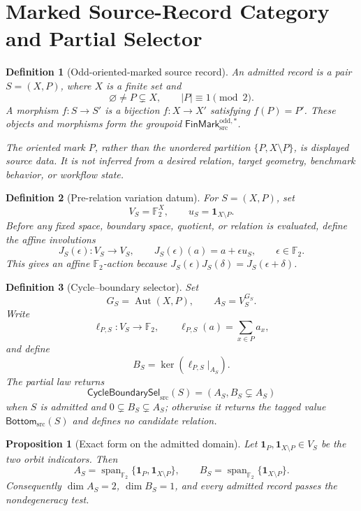 \documentclass[11pt]{article}
\newtheorem{definition}{Definition}
\newtheorem{proposition}{Proposition}
\newcommand{\Ftwo}{\mathbb F_2}
\newcommand{\Sel}{\mathsf{CycleBoundarySel}_{\mathrm{src}}}
\newcommand{\Bottom}{\mathsf{Bottom}_{\mathrm{src}}}
\begin{document}
\section{Marked Source-Record Category and Partial Selector}

\begin{definition}[Odd-oriented-marked source record]
An admitted record is a pair \(S=(X,P)\), where \(X\) is a finite set and
\[
 \varnothing\neq P\subsetneq X,\qquad |P|\equiv1\pmod2.
\]
A morphism \(f:S\to S'\) is a bijection \(f:X\to X'\) satisfying
\(f(P)=P'\). These objects and morphisms form the groupoid
\(\mathsf{FinMark}^{\mathrm{odd},*}_{\mathrm{src}}\).

The oriented mark \(P\), rather than the unordered partition
\(\{P,X\setminus P\}\), is displayed source data. It is not inferred from a
desired relation, target geometry, benchmark behavior, or workflow state.
\end{definition}

\begin{definition}[Pre-relation variation datum]
For \(S=(X,P)\), set
\[
 V_S=\Ftwo^X,\qquad u_S=\mathbf1_{X\setminus P}.
\]
Before any fixed space, boundary space, quotient, or relation is evaluated,
define the affine involutions
\[
 J_S(\epsilon):V_S\longrightarrow V_S,\qquad
 J_S(\epsilon)(a)=a+\epsilon u_S,\qquad \epsilon\in\Ftwo.
\]
This gives an affine \(\Ftwo\)-action because
\(J_S(\epsilon)J_S(\delta)=J_S(\epsilon+\delta)\).
\end{definition}

\begin{definition}[Cycle--boundary selector]
Set
\[
 G_S=\operatorname{Aut}(X,P),\qquad A_S=V_S^{G_S}.
\]
Write
\[
 \ell_{P,S}:V_S\longrightarrow\Ftwo,\qquad
 \ell_{P,S}(a)=\sum_{x\in P}a_x,
\]
and define
\[
 B_S=\ker\!\left(\ell_{P,S}|_{A_S}\right).
\]
The partial law returns
\[
 \Sel(S)=(A_S,B_S\subsetneq A_S)
\]
when \(S\) is admitted and \(0\subsetneq B_S\subsetneq A_S\); otherwise it
returns the tagged value \(\Bottom(S)\) and defines no candidate relation.
\end{definition}

\begin{proposition}[Exact form on the admitted domain]
Let \(\mathbf 1_P,\mathbf 1_{X\setminus P}\in V_S\) be the two orbit
indicators. Then
\[
 A_S=\operatorname{span}_{\Ftwo}
 \{\mathbf1_P,\mathbf1_{X\setminus P}\},\qquad
 B_S=\operatorname{span}_{\Ftwo}\{\mathbf1_{X\setminus P}\}.
\]
Consequently \(\dim A_S=2\), \(\dim B_S=1\), and every admitted record
passes the nondegeneracy test.
\end{proposition}
\end{document}
